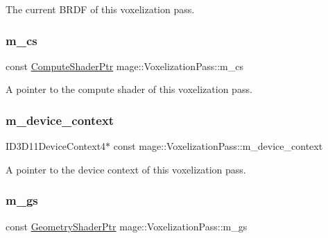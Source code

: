 The current B\+R\+DF of this voxelization pass. \hypertarget{classmage_1_1_voxelization_pass_a7742451b2503ef5208fc286dd32a6d9b}{}\label{classmage_1_1_voxelization_pass_a7742451b2503ef5208fc286dd32a6d9b} 
\subsubsection{\texorpdfstring{m\+\_\+cs}{m\_cs}}
{\footnotesize\ttfamily const \hyperlink{namespacemage_a95ee75d4d07106395d80f751d364dc1b}{Compute\+Shader\+Ptr} mage\+::\+Voxelization\+Pass\+::m\+\_\+cs\hspace{0.3cm}{\ttfamily [private]}}

A pointer to the compute shader of this voxelization pass. \hypertarget{classmage_1_1_voxelization_pass_ae7f5f5ea9045f546d2b274336a031b6a}{}\label{classmage_1_1_voxelization_pass_ae7f5f5ea9045f546d2b274336a031b6a} 
\subsubsection{\texorpdfstring{m\+\_\+device\+\_\+context}{m\_device\_context}}
{\footnotesize\ttfamily I\+D3\+D11\+Device\+Context4$\ast$ const mage\+::\+Voxelization\+Pass\+::m\+\_\+device\+\_\+context\hspace{0.3cm}{\ttfamily [private]}}

A pointer to the device context of this voxelization pass. \hypertarget{classmage_1_1_voxelization_pass_aaf6915c46f6a550d494501ded0a44651}{}\label{classmage_1_1_voxelization_pass_aaf6915c46f6a550d494501ded0a44651} 
\subsubsection{\texorpdfstring{m\+\_\+gs}{m\_gs}}
{\footnotesize\ttfamily const \hyperlink{namespacemage_acc49e8e93ccc87613b02dd688f0db21a}{Geometry\+Shader\+Ptr} mage\+::\+Voxelization\+Pass\+::m\+\_\+gs\hspace{0.3cm}{\ttfamily [private]}}

